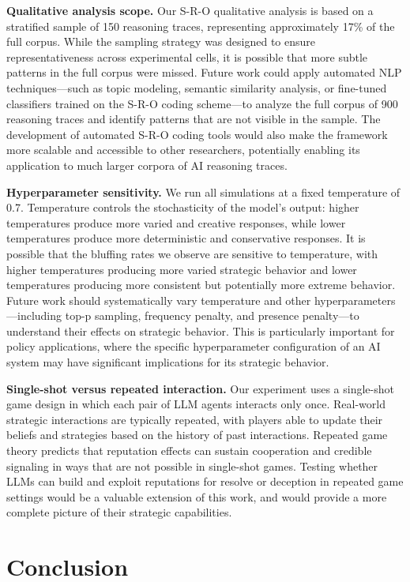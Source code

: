 \documentclass[12pt]{article}
\theoremstyle{plain}
\theoremstyle{definition}
\begin{document}
\textbf{Qualitative analysis scope.} Our S-R-O qualitative analysis is based on a stratified sample of 150 reasoning traces, representing approximately 17\% of the full corpus. While the sampling strategy was designed to ensure representativeness across experimental cells, it is possible that more subtle patterns in the full corpus were missed. Future work could apply automated NLP techniques---such as topic modeling, semantic similarity analysis, or fine-tuned classifiers trained on the S-R-O coding scheme---to analyze the full corpus of 900 reasoning traces and identify patterns that are not visible in the sample. The development of automated S-R-O coding tools would also make the framework more scalable and accessible to other researchers, potentially enabling its application to much larger corpora of AI reasoning traces.

\textbf{Hyperparameter sensitivity.} We run all simulations at a fixed temperature of 0.7. Temperature controls the stochasticity of the model's output: higher temperatures produce more varied and creative responses, while lower temperatures produce more deterministic and conservative responses. It is possible that the bluffing rates we observe are sensitive to temperature, with higher temperatures producing more varied strategic behavior and lower temperatures producing more consistent but potentially more extreme behavior. Future work should systematically vary temperature and other hyperparameters---including top-p sampling, frequency penalty, and presence penalty---to understand their effects on strategic behavior. This is particularly important for policy applications, where the specific hyperparameter configuration of an AI system may have significant implications for its strategic behavior.

\textbf{Single-shot versus repeated interaction.} Our experiment uses a single-shot game design in which each pair of LLM agents interacts only once. Real-world strategic interactions are typically repeated, with players able to update their beliefs and strategies based on the history of past interactions. Repeated game theory predicts that reputation effects can sustain cooperation and credible signaling in ways that are not possible in single-shot games. Testing whether LLMs can build and exploit reputations for resolve or deception in repeated game settings would be a valuable extension of this work, and would provide a more complete picture of their strategic capabilities.

\section{Conclusion}
\end{document}
